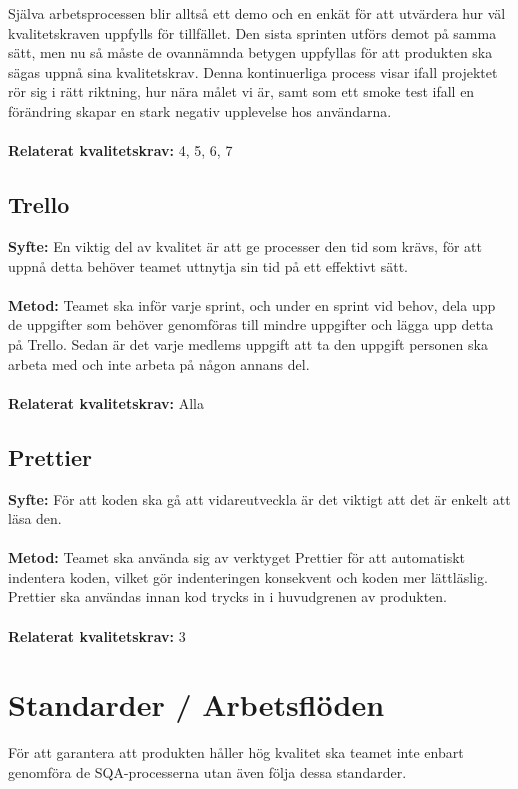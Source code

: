 \documentclass[10pt]{article}
\begin{document}
	Själva arbetsprocessen blir alltså ett demo och en enkät för att utvärdera hur väl kvalitetskraven uppfylls för tillfället. Den sista sprinten utförs demot på samma sätt, men nu så måste de ovannämnda betygen uppfyllas för att produkten ska sägas uppnå sina kvalitetskrav. Denna kontinuerliga process visar ifall projektet rör sig i rätt riktning, hur nära målet vi är, samt som ett smoke test ifall en förändring skapar en stark negativ upplevelse hos användarna.
	\\\\
	\textbf{Relaterat kvalitetskrav:} 4, 5, 6, 7
	\\
	
	
	\subsection{Trello}
	\textbf{Syfte:} En viktig del av kvalitet är att ge processer den tid som krävs, för att uppnå detta behöver teamet uttnytja sin tid på ett effektivt sätt.
	\\\\
	\textbf{Metod:} Teamet ska inför varje sprint, och under en sprint vid behov, dela upp de uppgifter som behöver genomföras till mindre uppgifter och lägga upp detta på Trello. Sedan är det varje medlems uppgift att ta den uppgift personen ska arbeta med och inte arbeta på någon annans del.
	\\\\
	\textbf{Relaterat kvalitetskrav:} Alla
	\\
	
	\subsection{Prettier}
	\textbf{Syfte:} För att koden ska gå att vidareutveckla är det viktigt att det är enkelt att läsa den.
	\\\\
	\textbf{Metod:} Teamet ska använda sig av verktyget Prettier för att automatiskt indentera koden, vilket gör indenteringen konsekvent och koden mer lättläslig. Prettier ska användas innan kod trycks in i huvudgrenen av produkten.
	\\\\
	\textbf{Relaterat kvalitetskrav:} 3
	\\
	
	
\pagebreak
\section{Standarder	/	Arbetsflöden}
	För att garantera att produkten håller hög kvalitet ska teamet inte enbart genomföra de SQA-processerna utan även följa dessa standarder.
	
\end{document}
